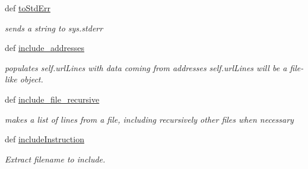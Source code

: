 \begin{DoxyCompactItemize}
def \hyperlink{classuicilibris_1_1wikiParser_1_1wikiParser_ad28564c6961cdd8a72d8dbe417c2b349}{to\-Std\-Err}
\begin{DoxyCompactList}\small\item\em sends a string to sys.\-stderr \end{DoxyCompactList}\item 
def \hyperlink{classuicilibris_1_1wikiParser_1_1wikiParser_a3ce63812d8f61757627343437a74ce48}{include\-\_\-addresses}
\begin{DoxyCompactList}\small\item\em populates self.\-url\-Lines with data coming from addresses self.\-url\-Lines will be a file-\/like object. \end{DoxyCompactList}\item 
def \hyperlink{classuicilibris_1_1wikiParser_1_1wikiParser_a2af2d56994cbc429e28597a3e1037447}{include\-\_\-file\-\_\-recursive}
\begin{DoxyCompactList}\small\item\em makes a list of lines from a file, including recursively other files when necessary \end{DoxyCompactList}\item 
def \hyperlink{classuicilibris_1_1wikiParser_1_1wikiParser_a905ed62b491b474dadfd86d3e44da0ba}{include\-Instruction}
\begin{DoxyCompactList}\small\item\em \-Extract filename to include. \end{DoxyCompactList}\end{DoxyCompactItemize}
